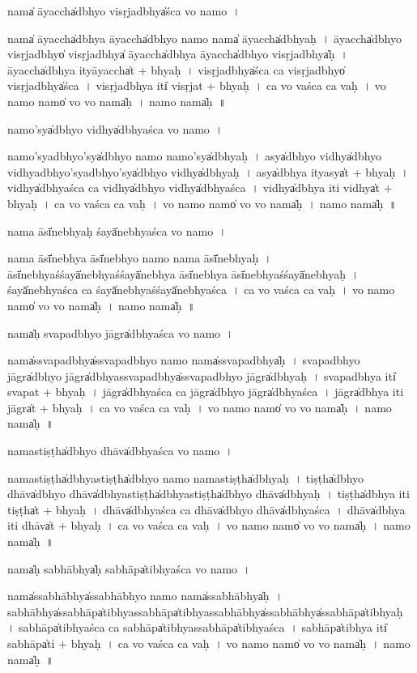 \documentclass[parskip, DIV=14]{scrartcl}
\begin{document}
{nama̍ ā॒yaccha̍dbhyo visṛ॒jadbhya̍śca vo॒ namo~।

nama̍ ā॒yaccha̍dbhya ā॒yaccha̍dbhyo॒ namo॒ nama̍ ā॒yaccha̍dbhyaḥ~।
ā॒yaccha̍dbhyo visṛ॒jadbhyo̍ visṛ॒jadbhya̍ ā॒yaccha̍dbhya ā॒yaccha̍dbhyo visṛ॒jadbhya̍ḥ~।
ā॒yaccha̍dbhya॒ ityā॒yaccha̍t + bhya॒ḥ~।
vi॒sṛ॒jadbhya̍śca ca visṛ॒jadbhyo̍ visṛ॒jadbhya̍śca~।
vi॒sṛ॒jadbhya॒ iti̍ visṛ॒jat + bhya॒ḥ~।
ca॒ vo॒ va॒śca॒ ca॒ va॒ḥ~।
vo॒ namo॒ namo̍ vo vo॒ nama̍ḥ~।
namo॒ nama̍ḥ~॥ 

namo'sya̍dbhyo॒ vidhya̍dbhyaśca vo॒ namo~।

namo'sya॒dbhyo'sya̍dbhyo॒ namo॒ namo'sya̍dbhyaḥ~।
asya̍dbhyo॒ vidhya̍dbhyo॒ vidhya॒dbhyo'sya॒dbhyo'sya̍dbhyo॒ vidhya̍dbhyaḥ~।
asya̍dbhya॒ ityasya̍t + bhya॒ḥ~।
vidhya̍dbhyaśca ca॒ vidhya̍dbhyo॒ vidhya̍dbhyaśca~।
vidhya̍dbhya॒ iti॒ vidhya̍t + bhya॒ḥ~।
ca॒ vo॒ va॒śca॒ ca॒ va॒ḥ~।
vo॒ namo॒ namo̍ vo vo॒ nama̍ḥ~।
namo॒ nama̍ḥ~॥ 

nama॒ āsī̍nebhya॒ḥ śayā̍nebhyaśca vo॒ namo~।

nama॒ āsī̍nebhya॒ āsī̍nebhyo॒ namo॒ nama॒ āsī̍nebhyaḥ~।
āsī̍nebhya॒śśayā̍nebhya॒śśayā̍nebhya॒ āsī̍nebhya॒ āsī̍nebhya॒śśayā̍nebhyaḥ~।
śayā̍nebhyaśca ca॒ śayā̍nebhya॒śśayā̍nebhyaśca~।
ca॒ vo॒ va॒śca॒ ca॒ va॒ḥ~।
vo॒ namo॒ namo̍ vo vo॒ nama̍ḥ~।
namo॒ nama̍ḥ~॥ 

nama̍ḥ sva॒padbhyo॒ jāgra̍dbhyaśca vo॒ namo~।

nama̍ssva॒padbhya̍ssva॒padbhyo॒ namo॒ nama̍ssva॒padbhya̍ḥ~।
sva॒padbhyo॒ jāgra̍dbhyo॒  jāgra̍dbhyassva॒padbhya̍ssva॒padbhyo॒ jāgra̍dbhyaḥ~।
sva॒padbhya॒ iti̍ sva॒pat + bhya॒ḥ~।
jāgra̍dbhyaśca ca॒ jāgra̍dbhyo॒ jāgra̍dbhyaśca~।
jāgra̍dbhya॒ iti॒ jāgra̍t + bhya॒ḥ~।
ca॒ vo॒ va॒śca॒ ca॒ va॒ḥ~।
vo॒ namo॒ namo̍ vo vo॒ nama̍ḥ~।
namo॒ nama̍ḥ~॥ 

nama॒stiṣṭha̍dbhyo॒ dhāva̍dbhyaśca vo॒ namo~।

na॒ma॒stiṣṭha̍dbhya॒stiṣṭha̍dbhyo॒ namo॒ nama॒stiṣṭha̍dbhyaḥ~।
tiṣṭha̍dbhyo॒ dhāva̍dbhyo॒ dhāva̍dbhya॒stiṣṭha̍dbhya॒stiṣṭha̍dbhyo॒ dhāva̍dbhyaḥ~।
tiṣṭha̍dbhya॒ iti॒ tiṣṭha̍t + bhya॒ḥ~।
dhāva̍dbhyaśca ca॒ dhāva̍dbhyo॒ dhāva̍dbhyaśca~।
dhāva̍dbhya॒ iti॒ dhāva̍t + bhya॒ḥ~।
ca॒ vo॒ va॒śca॒ ca॒ va॒ḥ~।
vo॒ namo॒ namo̍ vo vo॒ nama̍ḥ~।
namo॒ nama̍ḥ~॥ 

nama̍ḥ sa॒bhābhya̍ḥ sa॒bhāpa̍tibhyaśca vo॒ namo~।

nama̍ssa॒bhābhya̍ssa॒bhābhyo॒ namo॒ nama̍ssa॒bhābhya̍ḥ~।
sa॒bhābhya̍ssa॒bhāpa̍tibhyassa॒bhāpa̍tibhyassa॒bhābhya̍ssa॒bhābhya̍ssa॒bhāpa̍tibhyaḥ~।
sa॒bhāpa̍tibhyaśca ca sa॒bhāpa̍tibhyassa॒bhāpa̍tibhyaśca~।
sa॒bhāpa̍tibhya॒ iti̍ sa॒bhāpa̍ti + bhya॒ḥ~।
ca॒ vo॒ va॒śca॒ ca॒ va॒ḥ~।
vo॒ namo॒ namo̍ vo vo॒ nama̍ḥ~।
namo॒ nama̍ḥ~॥ 

}
\end{document}
